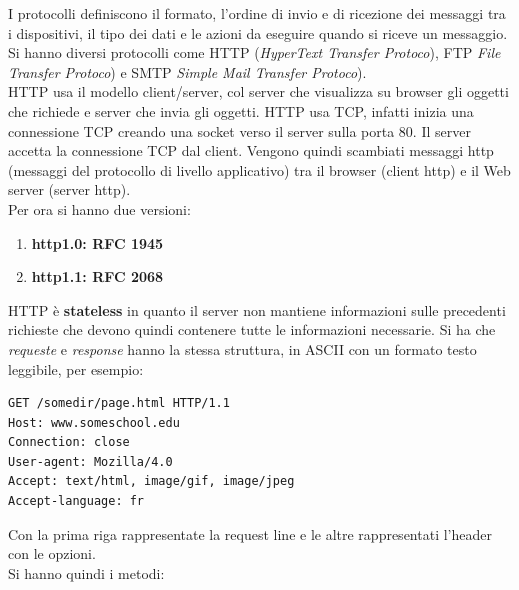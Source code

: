 \documentclass[a4paper,12pt, oneside]{book}
\begin{document}
I protocolli definiscono il formato, l'ordine di invio e di ricezione dei messaggi tra i dispositivi, il tipo dei dati e le azioni da eseguire quando si riceve un messaggio. Si hanno diversi protocolli come HTTP (\textit{HyperText Transfer Protoco}), FTP \textit{File Transfer Protoco}) e SMTP \textit{Simple Mail Transfer Protoco}).\\
HTTP usa il modello client/server, col server che visualizza su browser gli oggetti che richiede e server che invia gli oggetti. HTTP usa TCP, infatti inizia una connessione TCP creando una socket verso il server sulla porta 80. Il server accetta la connessione TCP dal client. Vengono quindi scambiati messaggi http (messaggi del protocollo
di livello applicativo) tra il browser (client http) e il Web
server (server http).\\
Per ora si hanno due versioni:
\begin{enumerate}
\item\textbf{ http1.0: RFC 1945}
\item\textbf{ http1.1: RFC 2068}
\end{enumerate}
HTTP è \textbf{stateless} in quanto il server non mantiene informazioni sulle precedenti richieste che devono quindi contenere tutte le informazioni necessarie. Si ha che \textit{requeste }e \textit{response} hanno la stessa struttura, in ASCII con un formato testo leggibile, per esempio:
\begin{verbatim}
GET /somedir/page.html HTTP/1.1
Host: www.someschool.edu
Connection: close
User-agent: Mozilla/4.0
Accept: text/html, image/gif, image/jpeg
Accept-language: fr
\end{verbatim}
Con la prima riga rappresentate la request line e le altre rappresentati l'header con le opzioni.\\
Si hanno quindi i metodi:
\end{document}
